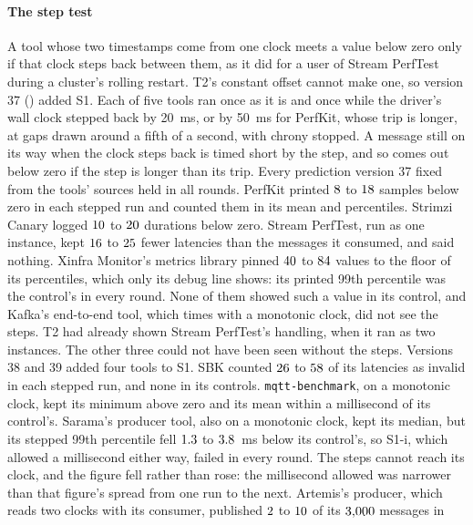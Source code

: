\documentclass[10pt,journal,onecolumn]{IEEEtran}
\newcommand{\kafka}{Kafka}
\begin{document}
\paragraph{The step test} A tool whose two timestamps come from one clock meets a value below zero
only if that clock steps back between them, as it did for a user of Stream PerfTest during a
cluster's rolling restart. T2's constant offset cannot make one, so version 37
() added S1. Each of five tools ran once as it is and once while
the driver's wall clock stepped back by 20~ms, or by 50~ms for PerfKit, whose trip is longer, at
gaps drawn around a fifth of a second, with chrony stopped. A message still
on its way when the clock steps back is timed short by the step, and so comes out below zero if the
step is longer than its trip. Every prediction version 37 fixed from the
tools' sources held in all \sOneRoundsWord{} rounds. PerfKit printed $8$ to $18$ samples below zero in each stepped run and
counted them in its mean and percentiles. Strimzi Canary logged $10$ to
$20$ durations below zero. Stream PerfTest, run as one instance, kept $16$ to
$25$ fewer latencies than the messages it consumed, and said nothing. Xinfra Monitor's
metrics library pinned $40$ to $84$ values to the floor of its percentiles,
which only its debug line shows: its printed 99th percentile was the control's in every round.
None of them showed such a value in its control, and \kafka{}'s end-to-end tool, which times with
a monotonic clock, did not see the steps. T2 had already shown Stream PerfTest's handling, when it
ran as two instances. The other three could not have been seen without the steps. Versions 38 and
39 added four tools to S1. SBK counted
$26$ to $58$ of its latencies as invalid in each stepped run, and none in its
controls. \texttt{mqtt-benchmark}, on a monotonic clock, kept its minimum above zero and its mean
within a millisecond of its control's. Sarama's producer tool, also on a monotonic clock, kept its
median, but its stepped 99th percentile fell $1.3$ to $3.8$~ms below its
control's, so S1-i, which allowed a millisecond either way, failed in every round. The steps cannot
reach its clock, and the figure fell rather than rose: the millisecond allowed was narrower than
that figure's spread from one run to the next. Artemis's producer, which reads two clocks with its
consumer, published $2$ to $10$ of its $3{,}000$ messages in
\end{document}
